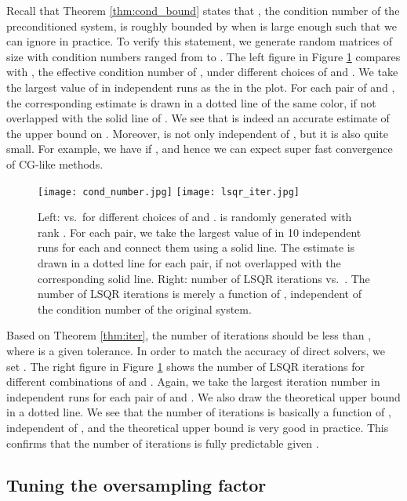 \documentclass{siamltex}
\begin{document}
Recall that Theorem \ref{thm:cond_bound} states that , the condition
number of the preconditioned system, is roughly bounded by
 when  is large enough such that we can ignore
 in practice. To verify this statement, we generate random matrices of
size  with condition numbers ranged from  to . The
left figure in Figure \ref{fig:cond_and_iter} compares  with
, the effective condition number of , under different choices of
 and . We take the largest value of  in  independent runs
as the  in the plot. For each pair of  and , the corresponding
estimate  is drawn in a dotted line of the same
color, if not overlapped with the solid line of . We see that
 is indeed an accurate estimate of the upper
bound on .  Moreover,  is not only independent of
, but it is also quite small. For example, we have
 if , and hence we can expect super
fast convergence of CG-like methods.
\begin{figure}
  \centering
  \texttt{[image: cond\_number.jpg]}
  \texttt{[image: lsqr\_iter.jpg]}
  \caption{Left:  vs.\  for different choices of 
    and .  is randomly generated with
    rank . For each  pair, we take the largest value of 
    in 10 independent runs for each  and connect them using a solid
    line. The estimate  is drawn in a dotted line
    for each  pair, if not overlapped with the corresponding solid
    line. Right: number of LSQR iterations vs.\ . The number of LSQR
    iterations is merely a function of , independent of the condition
    number of the original system.}
  \label{fig:cond_and_iter}
\end{figure}
Based on Theorem \ref{thm:iter}, the number of iterations should be less than
, where  is a given
tolerance. In order to match the accuracy of direct solvers, we set . The right figure in Figure \ref{fig:cond_and_iter} shows the number
of LSQR iterations for different combinations of  and . Again,
we take the largest iteration number in  independent runs for each pair of
 and . We also draw the theoretical upper bound  in a dotted line. We see that the number of
iterations is basically a function of , independent of , and
the theoretical upper bound is very good in practice.  This confirms that the
number of iterations is fully predictable given .

\subsection{Tuning the oversampling factor }
\label{sec:tuning-parameters}
\end{document}

